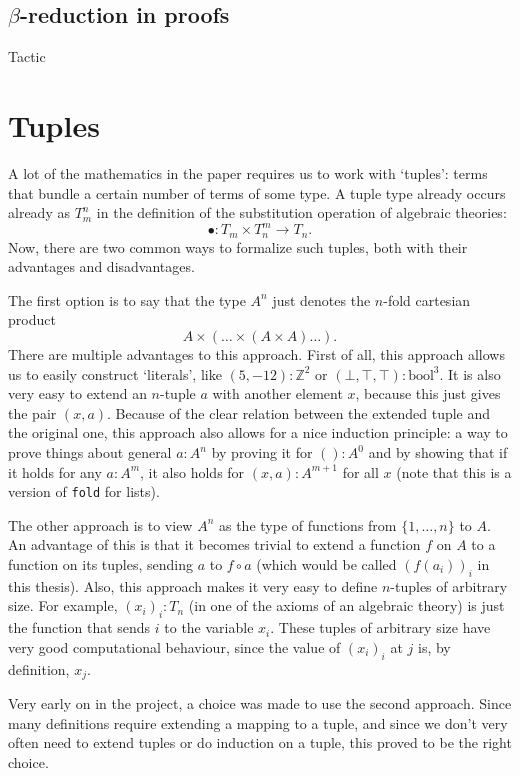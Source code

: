 \subsection{\texorpdfstring{$ \beta $}{beta}-reduction in proofs}
Tactic

\section{Tuples}

A lot of the mathematics in the paper requires us to work with `tuples': terms that bundle a certain number of terms of some type. A tuple type already occurs already as $ T_m^n $ in the definition of the substitution operation of algebraic theories:
\[ \bullet: T_m \times T_n^m \to T_n. \]
Now, there are two common ways to formalize such tuples, both with their advantages and disadvantages.

The first option is to say that the type $ A^n $ just denotes the $ n $-fold cartesian product
\[ A \times (\dots \times (A \times A) \dots). \]
There are multiple advantages to this approach. First of all, this approach allows us to easily construct `literals', like $ (5, -12) : \mathbb Z^2 $ or $ (\bot, \top, \top) : \mathrm{bool}^3 $. It is also very easy to extend an $ n $-tuple $ a $ with another element $ x $, because this just gives the pair $ (x, a) $. Because of the clear relation between the extended tuple and the original one, this approach also allows for a nice induction principle: a way to prove things about general $ a : A^n $ by proving it for $ () : A^0 $ and by showing that if it holds for any $ a : A^m $, it also holds for $ (x, a) : A^{m + 1} $ for all $ x $ (note that this is a version of \texttt{fold} for lists).

The other approach is to view $ A^n $ as the type of functions from $ \{ 1, \dots, n \} $ to $ A $. An advantage of this is that it becomes trivial to extend a function $ f $ on $ A $ to a function on its tuples, sending $ a $ to $ f \circ a $ (which would be called $ (f(a_i))_i $ in this thesis). Also, this approach makes it very easy to define $ n $-tuples of arbitrary size. For example, $ (x_i)_i : T_n $ (in one of the axioms of an algebraic theory) is just the function that sends $ i $ to the variable $ x_i $. These tuples of arbitrary size have very good computational behaviour, since the value of $ (x_i)_i $ at $ j $ is, by definition, $ x_j $.

Very early on in the project, a choice was made to use the second approach. Since many definitions require extending a mapping to a tuple, and since we don't very often need to extend tuples or do induction on a tuple, this proved to be the right choice.


